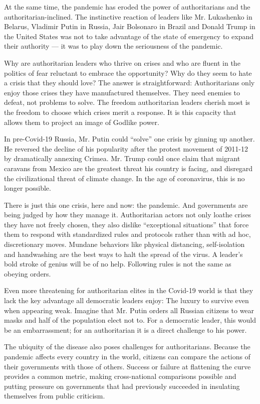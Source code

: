 At the same time, the pandemic has eroded the power of authoritarians
and the authoritarian-inclined. The instinctive reaction of leaders like
Mr. Lukashenko in Belarus, Vladimir Putin in Russia, Jair Bolsonaro in
Brazil and Donald Trump in the United States was not to take advantage
of the state of emergency to expand their authority --- it was to play
down the seriousness of the pandemic.

Why are authoritarian leaders who thrive on crises and who are fluent in
the politics of fear reluctant to embrace the opportunity? Why do they
seem to hate a crisis that they should love? The answer is
straightforward: Authoritarians only enjoy those crises they have
manufactured themselves. They need enemies to defeat, not problems to
solve. The freedom authoritarian leaders cherish most is the freedom to
choose which crises merit a response. It is this capacity that allows
them to project an image of Godlike power.

In pre-Covid-19 Russia, Mr. Putin could ``solve'' one crisis by ginning
up another. He reversed the decline of his popularity after the protest
movement of 2011-12 by dramatically annexing Crimea. Mr. Trump could
once claim that migrant caravans from Mexico are the greatest threat his
country is facing, and disregard the civilizational threat of climate
change. In the age of coronavirus, this is no longer possible.

There is just this one crisis, here and now: the pandemic. And
governments are being judged by how they manage it. Authoritarian actors
not only loathe crises they have not freely chosen, they also dislike
``exceptional situations'' that force them to respond with standardized
rules and protocols rather than with ad hoc, discretionary moves.
Mundane behaviors like physical distancing, self-isolation and
handwashing are the best ways to halt the spread of the virus. A
leader's bold stroke of genius will be of no help. Following rules is
not the same as obeying orders.

Even more threatening for authoritarian elites in the Covid-19 world is
that they lack the key advantage all democratic leaders enjoy: The
luxury to survive even when appearing weak. Imagine that Mr. Putin
orders all Russian citizens to wear masks and half of the population
elect not to. For a democratic leader, this would be an embarrassment;
for an authoritarian it is a direct challenge to his power.

The ubiquity of the disease also poses challenges for authoritarians.
Because the pandemic affects every country in the world, citizens can
compare the actions of their governments with those of others. Success
or failure at flattening the curve provides a common metric, making
cross-national comparisons possible and putting pressure on governments
that had previously succeeded in insulating themselves from public
criticism.

